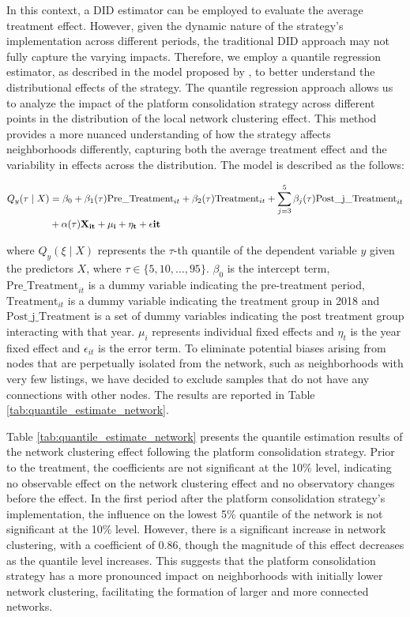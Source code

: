 \documentclass[11pt]{article}
\begin{document}
In this context, a DID estimator can be employed to evaluate the average treatment effect. However, given the dynamic nature of the strategy's implementation across different periods, the traditional DID approach may not fully capture the varying impacts. Therefore, we employ a quantile regression estimator, as described in the model proposed by \citep{machado_quantiles_2019}, to better understand the distributional effects of the strategy. The quantile regression approach allows us to analyze the impact of the platform consolidation strategy across different points in the distribution of the local network clustering effect. This method provides a more nuanced understanding of how the strategy affects neighborhoods differently, capturing both the average treatment effect and the variability in effects across the distribution. The model is described as the follows:

\begin{equation}
  \begin{aligned}
    Q_y(\tau \mid X) & = \beta_0 + \beta_1(\tau) \text{Pre\_Treatment}_{it} + \beta_2(\tau) \text{Treatment}_{it} + \sum_{j=3}^5 \beta_j(\tau) \text{Post\_j\_Treatment}_{it} \\
                     & + \alpha(\tau) \bf{X}_{it} + \mu_i + \eta_t + \epsilon{it}
  \end{aligned}
\end{equation}

where $Q_y(\xi \mid X)$ represents the $\tau$-th quantile of the dependent variable $y$ given the predictors $X$, where $\tau \in \{5, 10, \ldots, 95\}$. $\beta_0$ is the intercept term, $\text{Pre\_Treatment}_{it}$ is a dummy variable indicating the pre-treatment period, $\text{Treatment}_{it}$ is a dummy variable indicating the treatment group in 2018 and $\text{Post\_j\_Treatment}$ is a set of dummy variables indicating the post treatment group interacting with that year. $\mu_i$ represents individual fixed effects and $\eta_t$ is the year fixed effect and $\epsilon_{it}$ is the error term. To eliminate potential biases arising from nodes that are perpetually isolated from the network, such as neighborhoods with very few listings, we have decided to exclude samples that do not have any connections with other nodes. The results are reported in Table \ref{tab:quantile_estimate_network}. 

Table \ref{tab:quantile_estimate_network} presents the quantile estimation results of the network clustering effect following the platform consolidation strategy. Prior to the treatment, the coefficients are not significant at the 10\% level, indicating no observable effect on the network clustering effect and no observatory changes before the effect. In the first period after the platform consolidation strategy's implementation, the influence on the lowest 5\% quantile of the network is not significant at the 10\% level. However, there is a significant increase in network clustering, with a coefficient of 0.86, though the magnitude of this effect decreases as the quantile level increases. This suggests that the platform consolidation strategy has a more pronounced impact on neighborhoods with initially lower network clustering, facilitating the formation of larger and more connected networks.
\end{document}
